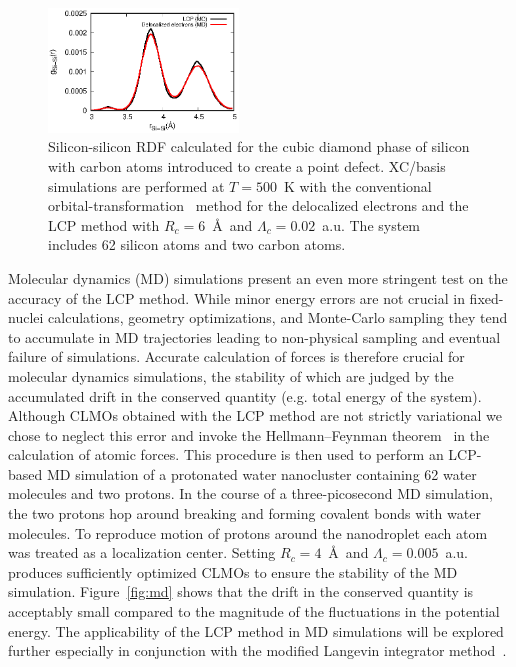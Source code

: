 \documentclass[aps,prl,twocolumn,reprint,amsmath,amssymb]{revtex4-1}
\begin{document}
\begin{figure}
\centering
\includegraphics[width=0.45\textwidth]{rdf_si}
\caption{Silicon-silicon RDF calculated for the cubic diamond phase of silicon with carbon atoms introduced to create a point defect. XC/basis simulations are performed at $T=500$~K with the conventional orbital-transformation~\cite{vandevondele2003efficient} method for the delocalized electrons and the LCP method with $R_c = 6$~\AA\ and $\Lambda_c = 0.02$~a.u. The system includes 62 silicon atoms and two carbon atoms.}
\label{fig:mc}
\end{figure}


Molecular dynamics (MD) simulations present an even more stringent test on the accuracy of the LCP method. While minor energy errors are not crucial in fixed-nuclei calculations, geometry optimizations, and Monte-Carlo sampling they tend to accumulate in MD trajectories leading to non-physical sampling and eventual failure of simulations. Accurate calculation of forces is therefore crucial for molecular dynamics simulations, the stability of which are judged by the accumulated drift in the conserved quantity (e.g. total energy of the system). Although CLMOs obtained with the LCP method are not strictly variational we chose to neglect this error and invoke the Hellmann--Feynman theorem~\cite{feynman1939forces} in the calculation of atomic forces. This procedure is then used to perform an LCP-based MD simulation of a protonated water nanocluster containing 62 water molecules and two protons. In the course of a three-picosecond MD simulation, the two protons hop around breaking and forming covalent bonds with water molecules. To reproduce motion of protons around the nanodroplet each atom was treated as a localization center. Setting $R_c = 4$~\AA\ and $\Lambda_c = 0.005$~a.u. produces sufficiently optimized CLMOs to ensure the stability of the MD simulation. Figure~\ref{fig:md} shows that the drift in the conserved quantity is acceptably small compared to the magnitude of the fluctuations in the potential energy. The applicability of the LCP method in MD simulations will be explored further especially in conjunction with the modified Langevin integrator method~\cite{scheiber2018communication}. 
\end{document}

